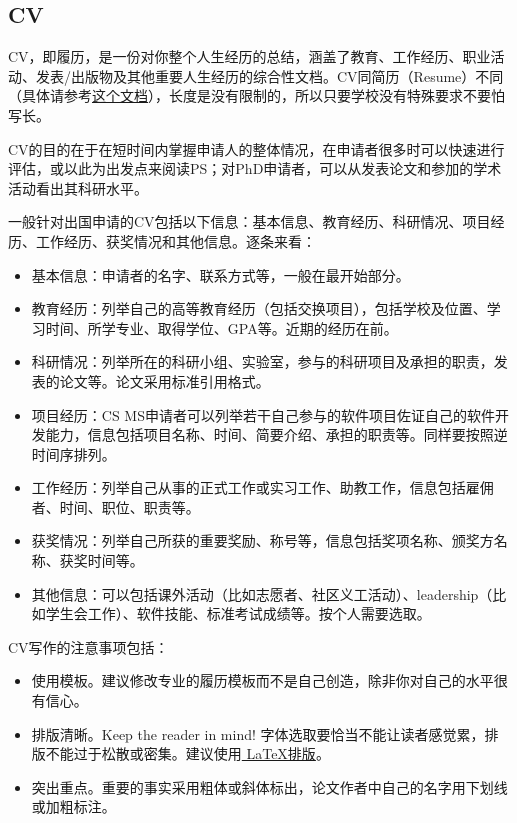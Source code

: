 \subsection{CV}

CV，即履历，是一份对你整个人生经历的总结，涵盖了教育、工作经历、职业活动、发表/出版物及其他重要人生经历的综合性文档。CV同简历（Resume）不同（具体请参考\href{http://studentaffairs.psu.edu/career/pdf/CG/CG_Vita.pdf}{这个文档}），长度是没有限制的，所以只要学校没有特殊要求不要怕写长。\par

CV的目的在于在短时间内掌握申请人的整体情况，在申请者很多时可以快速进行评估，或以此为出发点来阅读PS；对PhD申请者，可以从发表论文和参加的学术活动看出其科研水平。\par

一般针对出国申请的CV包括以下信息：基本信息、教育经历、科研情况、项目经历、工作经历、获奖情况和其他信息。逐条来看：
\begin{itemize}
\item 基本信息：申请者的名字、联系方式等，一般在最开始部分。
\item 教育经历：列举自己的高等教育经历（包括交换项目），包括学校及位置、学习时间、所学专业、取得学位、GPA等。近期的经历在前。
\item 科研情况：列举所在的科研小组、实验室，参与的科研项目及承担的职责，发表的论文等。论文采用标准引用格式。
\item 项目经历：CS MS申请者可以列举若干自己参与的软件项目佐证自己的软件开发能力，信息包括项目名称、时间、简要介绍、承担的职责等。同样要按照逆时间序排列。
\item 工作经历：列举自己从事的正式工作或实习工作、助教工作，信息包括雇佣者、时间、职位、职责等。
\item 获奖情况：列举自己所获的重要奖励、称号等，信息包括奖项名称、颁奖方名称、获奖时间等。
\item 其他信息：可以包括课外活动（比如志愿者、社区义工活动）、leadership（比如学生会工作）、软件技能、标准考试成绩等。按个人需要选取。
\end{itemize}

CV写作的注意事项包括：
\begin{itemize}
\item 使用模板。建议修改专业的履历模板而不是自己创造，除非你对自己的水平很有信心。
\item 排版清晰。Keep the reader in mind! 字体选取要恰当不能让读者感觉累，排版不能过于松散或密集。建议使用\href{www.latextemplates.com}{ \LaTeX{}排版}。
\item 突出重点。重要的事实采用粗体或斜体标出，论文作者中自己的名字用下划线或加粗标注。
\end{itemize}


